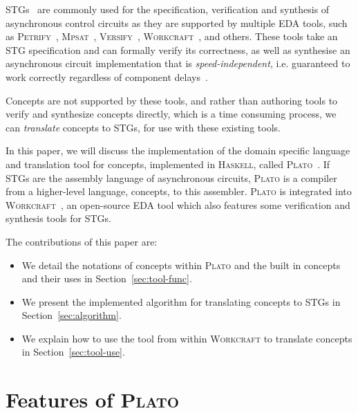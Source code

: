 \documentclass[british,conference,compsoc]{IEEEtran}
\newcommand{\noun}[1]{\textsc{#1}}
\begin{document}
STGs~\cite{Chu_1987_phd}\cite{Rosenblum_1985_tpn} are commonly used for the 
specification, verification and synthesis of asynchronous control circuits as 
they are supported by multiple EDA tools, such as 
\noun{Petrify}~\cite{Cortadella}, \noun{Mpsat}~\cite{khomenko2004detecting}, 
\noun{Versify}~\cite{i1997formal}, 
\noun{Workcraft}~\cite{2007_poliakov_workcraft}\cite{Workcraft_website}, 
and others. These tools take an STG specification and can formally verify its correctness, 
as well as synthesise an asynchronous circuit implementation that is 
\emph{speed-independent}, i.e. guaranteed to work correctly regardless of 
component delays~\cite{Muller_1959_ts}.

Concepts are not supported by these tools, and rather than
authoring tools to verify and synthesize concepts directly, which is a time 
consuming process, we can \emph{translate} concepts to STGs, for use with these
existing tools.

In this paper, we will discuss the implementation of the domain specific 
language and translation tool for concepts, implemented in \noun{Haskell}, called 
\noun{Plato}~\cite{2016_concepts_github}.
If STGs are the assembly language of asynchronous circuits, \noun{Plato} is a 
compiler from a higher-level language, concepts, to this assembler. \noun{Plato} is 
integrated into \noun{Workcraft}~\cite{Workcraft_website}, an open-source 
EDA tool which also features some verification and synthesis tools for STGs.

The contributions of this paper are:
\vspace{-1mm}
\begin{itemize}
  \item We detail the notations of concepts within \noun{Plato} and the built in
  concepts and their uses in Section~\ref{sec:tool-func}.
  \item We present the implemented algorithm for translating concepts to STGs
  in Section~\ref{sec:algorithm}.
  \item We explain how to use the tool from within
  \noun{Workcraft} to translate concepts in Section~\ref{sec:tool-use}.
\end{itemize}


\section{Features of \noun{Plato}\label{sec:tool-func}}
\end{document}
